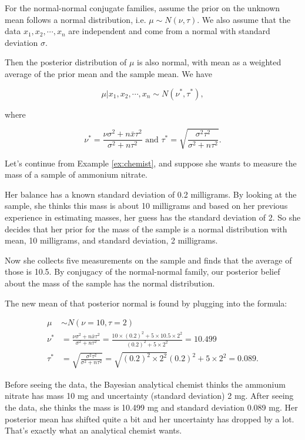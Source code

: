 \documentclass[]{book}
\theoremstyle{definition}
\theoremstyle{definition}
\theoremstyle{remark}
\begin{document}
For the normal-normal conjugate families, assume the prior on the
unknown mean follows a normal distribution, i.e.
\(\mu \sim N(\nu, \tau)\). We also assume that the data
\(x_1,x_2,\cdots,x_n\) are independent and come from a normal with
standard deviation \(\sigma\).

Then the posterior distribution of \(\mu\) is also normal, with mean as
a weighted average of the prior mean and the sample mean. We have

\[\mu|x_1,x_2,\cdots,x_n \sim N(\nu^*, \tau^*),\]

where

\[\nu^* = \frac{\nu\sigma^2 + n\bar{x}\tau^2}{\sigma^2 + n\tau^2} \text{ and } \tau^* = \sqrt{\frac{\sigma^2\tau^2}{\sigma^2 + n\tau^2}}.\]

Let's continue from Example \ref{ex:chemist}, and suppose she wants to
measure the mass of a sample of ammonium nitrate.

Her balance has a known standard deviation of 0.2 milligrams. By looking
at the sample, she thinks this mass is about 10 milligrams and based on
her previous experience in estimating masses, her guess has the standard
deviation of 2. So she decides that her prior for the mass of the sample
is a normal distribution with mean, 10 milligrams, and standard
deviation, 2 milligrams.

Now she collects five measurements on the sample and finds that the
average of those is 10.5. By conjugacy of the normal-normal family, our
posterior belief about the mass of the sample has the normal
distribution.

The new mean of that posterior normal is found by plugging into the
formula:

\[\begin{aligned}
\mu &\sim N(\nu=10, \tau=2) \\
\nu^*  &= \frac{\nu\sigma^2 + n\bar{x}\tau^2}{\sigma^2 + n\tau^2} = \frac{10\times(0.2)^2+5\times10.5\times2^2}{(0.2)^2+5\times2^2} = 10.499\\
\tau^* &= \sqrt{\frac{\sigma^2\tau^2}{\sigma^2 + n\tau^2}} = \sqrt{(0.2)^2\times2^2}{(0.2)^2+5\times2^2} = 0.089.
\end{aligned}\]

Before seeing the data, the Bayesian analytical chemist thinks the
ammonium nitrate has mass 10 mg and uncertainty (standard deviation) 2
mg. After seeing the data, she thinks the mass is 10.499 mg and standard
deviation 0.089 mg. Her posterior mean has shifted quite a bit and her
uncertainty has dropped by a lot. That's exactly what an analytical
chemist wants.
\end{document}
